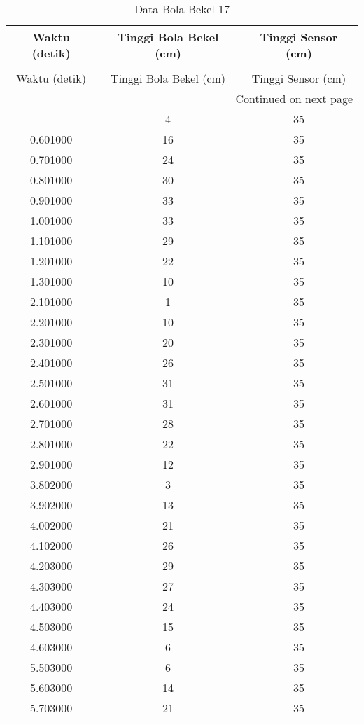 \begin{longtable}[htbp]{|c|c|c|}
\caption{Data Bola Bekel 17} \\
\hline
Waktu (detik) & Tinggi Bola Bekel (cm) & Tinggi Sensor (cm) \\ \hline
\endfirsthead
\caption[]{Data Bola Bekel 17} \\
\hline
Waktu (detik) & Tinggi Bola Bekel (cm) & Tinggi Sensor (cm) \\ \hline
\endhead
\multicolumn{3}{r}{Continued on next page} \\
\endfoot
\endlastfoot
0.501000 & 4 & 35 \\ \hline
0.601000 & 16 & 35 \\ \hline
0.701000 & 24 & 35 \\ \hline
0.801000 & 30 & 35 \\ \hline
0.901000 & 33 & 35 \\ \hline
1.001000 & 33 & 35 \\ \hline
1.101000 & 29 & 35 \\ \hline
1.201000 & 22 & 35 \\ \hline
1.301000 & 10 & 35 \\ \hline
2.101000 & 1 & 35 \\ \hline
2.201000 & 10 & 35 \\ \hline
2.301000 & 20 & 35 \\ \hline
2.401000 & 26 & 35 \\ \hline
2.501000 & 31 & 35 \\ \hline
2.601000 & 31 & 35 \\ \hline
2.701000 & 28 & 35 \\ \hline
2.801000 & 22 & 35 \\ \hline
2.901000 & 12 & 35 \\ \hline
3.802000 & 3 & 35 \\ \hline
3.902000 & 13 & 35 \\ \hline
4.002000 & 21 & 35 \\ \hline
4.102000 & 26 & 35 \\ \hline
4.203000 & 29 & 35 \\ \hline
4.303000 & 27 & 35 \\ \hline
4.403000 & 24 & 35 \\ \hline
4.503000 & 15 & 35 \\ \hline
4.603000 & 6 & 35 \\ \hline
5.503000 & 6 & 35 \\ \hline
5.603000 & 14 & 35 \\ \hline
5.703000 & 21 & 35 \\ \hline

\end{longtable}
